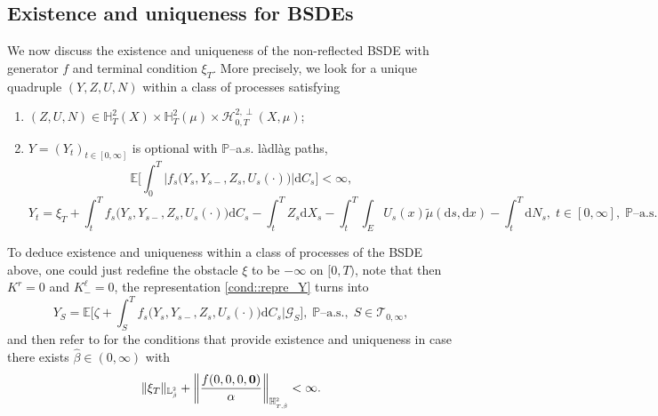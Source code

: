 \documentclass[10pt]{article} %
\newcommand\cG{\mathcal G}
\newcommand\cH{\mathcal H}
\newcommand\cT{\mathcal T}
\newcommand{\smalltext}[1]{\text{\fontsize{4}{4}\selectfont$#1$}}
\def \E{\mathbb{E}}
\def \H{\mathbb{H}}
\def \L{\mathbb{L}}
\def \P{\mathbb{P}}
\newcommand{\1}{\mathbf{1}}
\def\d{\mathrm{d}}
\begin{document}
\subsection{Existence and uniqueness for BSDEs}\label{sec::main_results_bsde}

We now discuss the existence and uniqueness of the non-reflected BSDE with generator $f$ and terminal condition $\xi_T$. More precisely, we look for a unique quadruple $(Y,Z,U,N)$ within a class of processes satisfying
\begin{enumerate}[{\bf (B1)}, leftmargin=0.9cm]
	\item\label{BSDE1} $(Z,U,N) \in \H^2_T(X) \times \H^2_T(\mu) \times \cH^{2,\perp}_{0,T}(X,\mu)$;
	\item\label{BSDE2} $Y = (Y_t)_{t \in [0,\infty]}$ is optional with $\P$--a.s. l\`adl\`ag paths,
		\begin{equation*}
			\E\bigg[\int_0^T \big|f_s\big(Y_s,Y_{s-},Z_s,U_s(\cdot)\big)\big|\d C_s\bigg] < \infty,
		\end{equation*}
		\begin{equation*}
			Y_t = \xi_T + \int_t^T f_s\big(Y_s,Y_{s-},Z_s,U_s(\cdot)\big) \d C_s - \int_t^T Z_s \d X_s - \int_t^T \int_E U_s(x)\tilde\mu(\d s, \d x) - \int_t^T \d N_s, \; t \in [0,\infty], \; \text{$\P$--a.s.}
		\end{equation*}
\end{enumerate}
To deduce existence and uniqueness within a class of processes of the BSDE above, one could just redefine the obstacle $\xi$ to be $-\infty$ on $[0,T)$, note that then $K^r = 0$ and $K^\ell_{-} = 0$, the representation \ref{cond::repre_Y} turns into
\begin{equation*}
	Y_S = \E\bigg[\zeta + \int_S^T f_s\big(Y_s,Y_{s-},Z_s,U_s(\cdot)\big)\d C_s\bigg| \cG_S\bigg], \; \text{$\P$--a.s.}, \; S \in \cT_{0,\infty},
\end{equation*}
and then refer to  for the conditions that provide existence and uniqueness in case there exists $\hat\beta \in (0,\infty)$ with
\begin{equation}\label{eq::integrability_bsde}
	\|\xi_T\|_{\L^\smalltext{2}_\smalltext{\hat\beta}} + \bigg\|\frac{f(0,0,0,\mathbf{0})}{\alpha}\bigg\|_{\H^\smalltext{2}_{\smalltext{T}\smalltext{,}\smalltext{\hat\beta}}} < \infty.
\end{equation}
\end{document}
